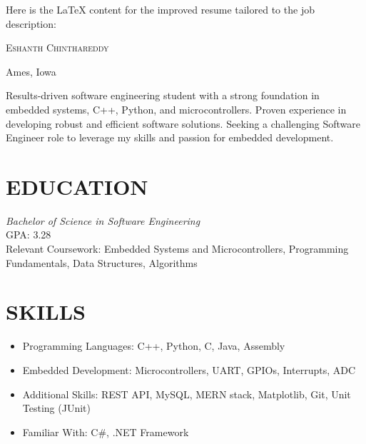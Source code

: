 \documentclass[letterpaper,11pt]{article}
\newcommand{\name}[1]{\centerline{\Huge \scshape #1}\vspace{1.25ex}}
\newcommand{\address}[1]{\centerline{#1}\vspace{-7pt}}
\begin{document}
Here is the LaTeX content for the improved resume tailored to the job description:

\name{Eshanth Chinthareddy}
\address{Ames, Iowa}
\begin{resume}
\vspace{-10pt}
\begin{summary}
Results-driven software engineering student with a strong foundation in embedded systems, C++, Python, and microcontrollers. Proven experience in developing robust and efficient software solutions. Seeking a challenging Software Engineer role to leverage my skills and passion for embedded development.
\end{summary}
\section{EDUCATION}
\textit{Bachelor of Science in Software Engineering}\\
GPA: 3.28\\
Relevant Coursework: Embedded Systems and Microcontrollers, Programming Fundamentals, Data Structures, Algorithms
\section{SKILLS}
\begin{itemize}
    \item Programming Languages: C++, Python, C, Java, Assembly
    \item Embedded Development: Microcontrollers, UART, GPIOs, Interrupts, ADC
    \item Additional Skills: REST API, MySQL, MERN stack, Matplotlib, Git, Unit Testing (JUnit) 
    \item Familiar With: C\#, .NET Framework 
\end{itemize}

\end{resume}
\end{document}
